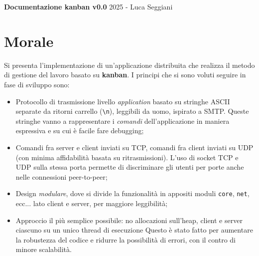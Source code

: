 \documentclass[9pt,a4paper]{article}
\begin{document}
\noindent
\textbf{Documentazione kanban v0.0} \hfill 2025 - Luca Seggiani

\section{Morale}
Si presenta l'implementazione di un’applicazione distribuita che realizza il metodo di gestione del lavoro basato su \textbf{kanban}.
I principi che si sono voluti seguire in fase di sviluppo sono:
\begin{itemize}
	\item Protocollo di trasmissione livello \textit{application} basato su stringhe ASCII separate da ritorni carrello (\lstinline|\n|), leggibili da uomo, ispirato a SMTP. Queste stringhe vanno a rappresentare i \textit{comandi} dell'applicazione in maniera espressiva e su cui è facile fare debugging;
	\item Comandi fra server e client inviati su TCP, comandi fra client inviati su UDP (con minima affidabilità basata su ritrasmissioni). L'uso di socket TCP e UDP sulla stessa porta permette di discriminare gli utenti per porte anche nelle connessioni peer-to-peer;
	\item Design \textit{modulare}, dove si divide la funzionalità in appositi moduli \lstinline|core|, \lstinline|net|, ecc... lato client e server, per maggiore leggibilità; 
	\item Approccio il più semplice possibile: no allocazioni sull'heap, client e server ciascuno su un unico thread di esecuzione Questo è stato fatto per aumentare la robustezza del codice e ridurre la possibilità di errori, con il contro di minore scalabilità. 
\end{itemize}
\end{document}
